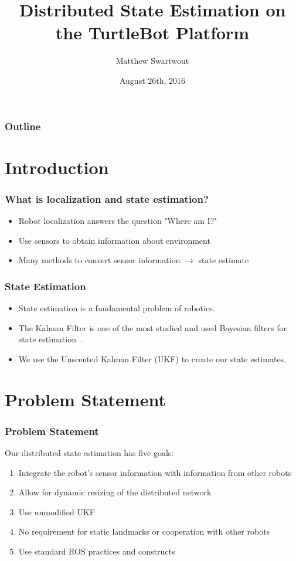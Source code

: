 \documentclass[14pt]{beamer}
\title{Distributed State Estimation on the TurtleBot Platform}
\author{Matthew Swartwout}
\date{August 26th, 2016}
\begin{document}
\begin{frame}
    \titlepage
\end{frame}

\begin{frame}
\frametitle{Outline}
\tableofcontents
\end{frame}

\section{Introduction}
\begin{frame}
\frametitle{What is localization and state estimation?}
\begin{itemize}
\item Robot localization answers the question "Where am I?"
\pause
\item Use sensors to obtain information about environment
\pause
\item Many methods to convert sensor information $\rightarrow$ state estimate
\end{itemize}
\end{frame}

\begin{frame}
\frametitle{State Estimation}
\begin{itemize}
\item State estimation is a fundamental problem of robotics.
\pause
\item The Kalman Filter is one of the most studied and used Bayesian filters for state estimation~\cite{Localization2003, Mohsin2014}.
\pause
\item We use the Unscented Kalman Filter (UKF) to create our state estimates.
\end{itemize}
\end{frame}

\section{Problem Statement}
\begin{frame}
\frametitle{Problem Statement}
Our distributed state estimation has five goals:
\pause
\begin{enumerate}
\item Integrate the robot's sensor information with information from other robots
\pause
\item Allow for dynamic resizing of the distributed network
\pause
\item Use unmodified UKF
\pause
\item No requirement for static landmarks or cooperation with other robots
\pause
\item Use standard ROS practices and constructs
\end{enumerate}
\end{frame}
\end{document}
